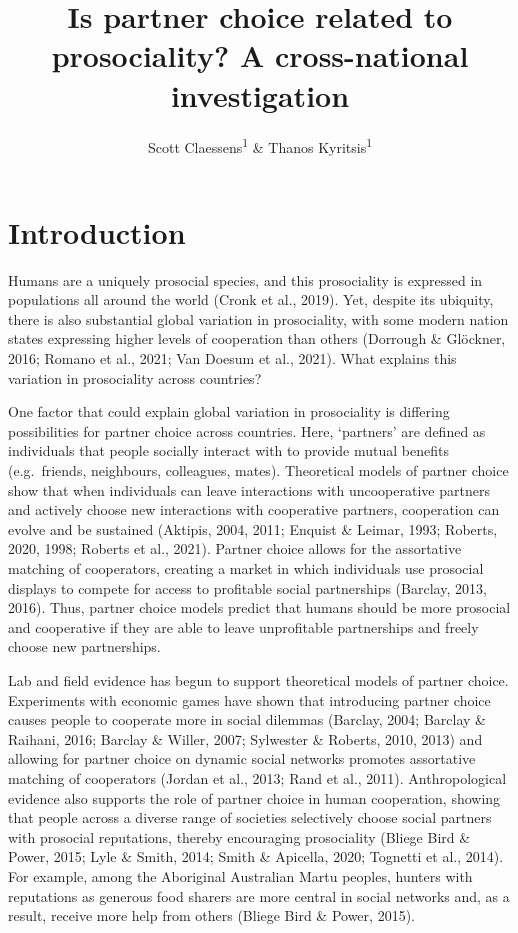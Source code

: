 \documentclass[
  man,floatsintext]{apa6}
\title{Is partner choice related to prosociality? A cross-national investigation}
\author{Scott Claessens\textsuperscript{1} \& Thanos Kyritsis\textsuperscript{1}}
\date{}
\affiliation{\vspace{0.5cm}\textsuperscript{1} School of Psychology, University of Auckland, Auckland, New Zealand}
\begin{document}
\maketitle

\hypertarget{introduction}{%
\section{Introduction}\label{introduction}}

Humans are a uniquely prosocial species, and this prosociality is expressed in populations all around the world (Cronk et al., 2019). Yet, despite its ubiquity, there is also substantial global variation in prosociality, with some modern nation states expressing higher levels of cooperation than others (Dorrough \& Glöckner, 2016; Romano et al., 2021; Van Doesum et al., 2021). What explains this variation in prosociality across countries?

One factor that could explain global variation in prosociality is differing possibilities for partner choice across countries. Here, `partners' are defined as individuals that people socially interact with to provide mutual benefits (e.g.~friends, neighbours, colleagues, mates). Theoretical models of partner choice show that when individuals can leave interactions with uncooperative partners and actively choose new interactions with cooperative partners, cooperation can evolve and be sustained (Aktipis, 2004, 2011; Enquist \& Leimar, 1993; Roberts, 2020, 1998; Roberts et al., 2021). Partner choice allows for the assortative matching of cooperators, creating a market in which individuals use prosocial displays to compete for access to profitable social partnerships (Barclay, 2013, 2016). Thus, partner choice models predict that humans should be more prosocial and cooperative if they are able to leave unprofitable partnerships and freely choose new partnerships.

Lab and field evidence has begun to support theoretical models of partner choice. Experiments with economic games have shown that introducing partner choice causes people to cooperate more in social dilemmas (Barclay, 2004; Barclay \& Raihani, 2016; Barclay \& Willer, 2007; Sylwester \& Roberts, 2010, 2013) and allowing for partner choice on dynamic social networks promotes assortative matching of cooperators (Jordan et al., 2013; Rand et al., 2011). Anthropological evidence also supports the role of partner choice in human cooperation, showing that people across a diverse range of societies selectively choose social partners with prosocial reputations, thereby encouraging prosociality (Bliege Bird \& Power, 2015; Lyle \& Smith, 2014; Smith \& Apicella, 2020; Tognetti et al., 2014). For example, among the Aboriginal Australian Martu peoples, hunters with reputations as generous food sharers are more central in social networks and, as a result, receive more help from others (Bliege Bird \& Power, 2015).
\end{document}
